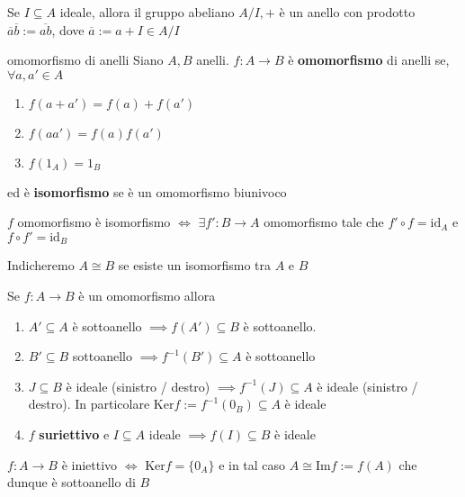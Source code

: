 \begin{proposition}
    Se \(I \subseteq A \) ideale, allora il gruppo abeliano \(A / I , +\)  è un
    anello con prodotto \(\overline{a} \overline{b} := \overline{ab}\), dove \(\overline{a} := a + I \in A / I\) 
\end{proposition}

\begin{definition}{omomorfismo di anelli}
    Siano \(A, B\) anelli. \(f: A\to B\) è \textbf{omomorfismo} di anelli se, \(\forall a, a' \in A\) 
\begin{enumerate}[label = \roman*)]
    \item \(f{(a + a')} = f{(a)} + f{(a')}\) 
    \item \(f{(a a')} = f{(a)}f{(a')}\) 
    \item \(f{(1_A)} = 1_B\) 
\end{enumerate}
ed è \textbf{isomorfismo} se è un omomorfismo biunivoco
\end{definition}
\begin{remark}{}
    \(f\) omomorfismo è isomorfismo \(\iff\) \(\exists f' : B\to A\) omomorfismo
    tale che \(f' \circ f = \mathrm{id}_A\) e \(f \circ f' = \mathrm{id}_B\) 
\end{remark}
Indicheremo \(A \cong B\) se esiste un isomorfismo tra \(A\) e \(B\) 
\begin{proposition}{}
    Se \(f : A\to B\) è un omomorfismo allora
\begin{enumerate}[label = \arabic*.]
    \item \(A' \subseteq A \) è sottoanello \(\implies f{(A')} \subseteq B  \) è
        sottoanello.
    \item \(B' \subseteq B \) sottoanello \(\implies f^{-1}{(B')} \subseteq A \) è sottoanello
    \item \(J \subseteq B \) è ideale (sinistro / destro) \(\implies f^{-1}{(J)} \subseteq A \) è ideale (sinistro / destro). In particolare \(\mathrm{Ker}f := f^{-1}{(0_B)} \subseteq A \) è ideale
    \item \(f\) \textbf{suriettivo} e \(I \subseteq A \) ideale \(\implies f{(I)} \subseteq B \) è ideale
\end{enumerate}
\end{proposition}

\begin{remark}{}
    \(f : A\to B\) è iniettivo \(\iff\) \(\mathrm{Ker} f = \{0_A\} \) e in tal
    caso \(A \cong \mathrm{Im}f := f{(A)}\) che dunque è sottoanello di \(B\) 
\end{remark}


